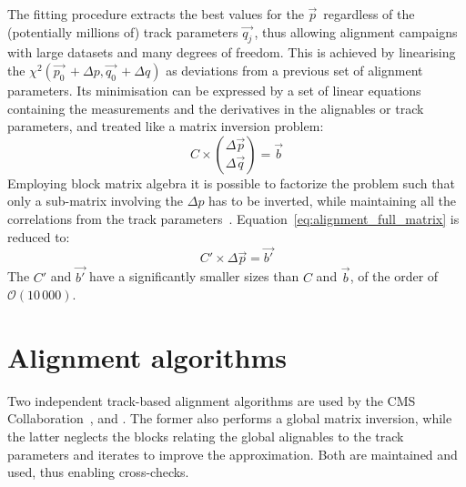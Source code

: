 The fitting procedure extracts the best values for the $\vec{p}\,$ regardless of the (potentially millions of) track parameters $\vec{q_j}\,$,
thus allowing alignment campaigns with large datasets and many degrees of freedom.
This is achieved by linearising the $\chi^2(\vec{p_0}\,+\Delta p, \vec{q_0}\,+\Delta q)$ as deviations from a previous set of alignment parameters.
Its minimisation can be expressed by a set of linear equations containing the measurements and the derivatives in the alignables or track parameters,
and treated like a matrix inversion problem:
\begin{equation}
  \label{eq:alignment_full_matrix}
  C \times \binom{\Delta\vec{p}}{\Delta\vec{q}} = \vec{b}
\end{equation}
Employing block matrix algebra it is possible to factorize the problem such that only a sub-matrix involving the $\Delta p$ has to be inverted,
while maintaining all the correlations from the track parameters~\cite{blobel2002new}.
Equation~\ref{eq:alignment_full_matrix} is reduced to:
\begin{equation}
  \label{eq:alignment_reduced_matrix}
  C' \times \Delta\vec{p} = \vec{b'}
\end{equation}
The $C'$ and $\vec{b'}$ have a significantly smaller sizes than $C$ and $\vec{b}$,
of the order of $\mathcal{O}(10\,000)$.

\section{Alignment algorithms}
Two independent track-based alignment algorithms are used by the CMS Collaboration~\cite{CMS-TRK-20-001}, \MPII and \HIPPY.
The former also performs a global matrix inversion, while the latter neglects the blocks
relating the global alignables to the track parameters and iterates to improve the approximation.
Both are maintained and used, thus enabling cross-checks.

